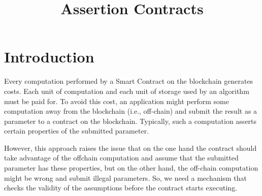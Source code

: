 \documentclass[runningheads]{llncs}
\begin{document}
%
\title{Assertion Contracts}
%
%

%
%
%
\maketitle              %
%
\begin{abstract}
 
\keywords{}
\end{abstract}

%
%
%
\section{Introduction}
\label{sec:introduction}
Every computation performed by a Smart Contract on the blockchain generates costs. Each
unit of computation and each unit of storage used by an algorithm must be paid for. To
avoid this cost, an application might perform some computation away from the blockchain
(i.e., off-chain) and submit the result as a parameter to a contract on the
blockchain. Typically, such a computation asserts certain properties of the 
submitted parameter. 

However, this approach raises the issue that on the one hand the contract should take
advantage of the offchain computation and assume that the submitted parameter has
these properties, but on the other hand, the off-chain computation might be wrong and
submit illegal parameters. So, we need a mechanism that checks the validity of the
assumptions before the contract starts executing.
\end{document}
